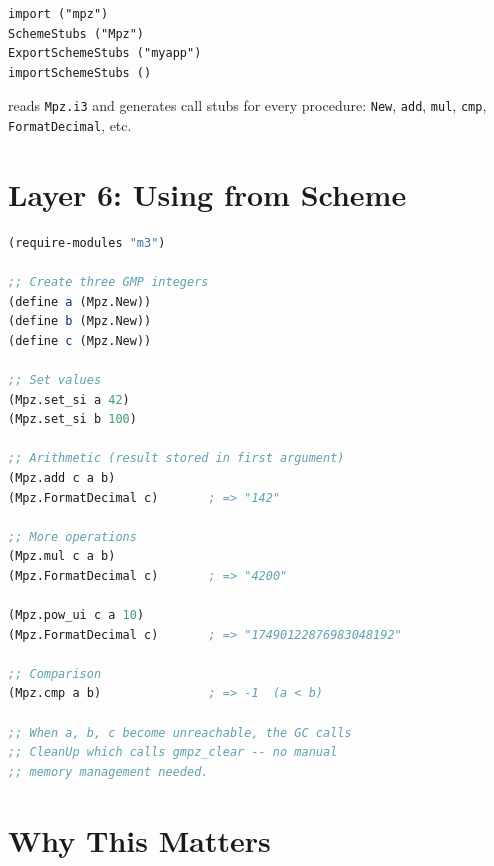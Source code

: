 \documentclass[12pt]{report}
\begin{document}
\begin{lstlisting}[language={}]
import ("mpz")
SchemeStubs ("Mpz")
ExportSchemeStubs ("myapp")
importSchemeStubs ()
\end{lstlisting}

 reads {\tt Mpz.i3} and generates call stubs
for every procedure: {\tt New}, {\tt add}, {\tt mul}, {\tt cmp},
{\tt FormatDecimal}, etc.

\section{Layer 6: Using from Scheme}

\begin{lstlisting}[language=Scheme]
(require-modules "m3")

;; Create three GMP integers
(define a (Mpz.New))
(define b (Mpz.New))
(define c (Mpz.New))

;; Set values
(Mpz.set_si a 42)
(Mpz.set_si b 100)

;; Arithmetic (result stored in first argument)
(Mpz.add c a b)
(Mpz.FormatDecimal c)       ; => "142"

;; More operations
(Mpz.mul c a b)
(Mpz.FormatDecimal c)       ; => "4200"

(Mpz.pow_ui c a 10)
(Mpz.FormatDecimal c)       ; => "17490122876983048192"

;; Comparison
(Mpz.cmp a b)               ; => -1  (a < b)

;; When a, b, c become unreachable, the GC calls
;; CleanUp which calls gmpz_clear -- no manual
;; memory management needed.
\end{lstlisting}

\section{Why This Matters}

\begin{center}
\end{center}
\end{document}
